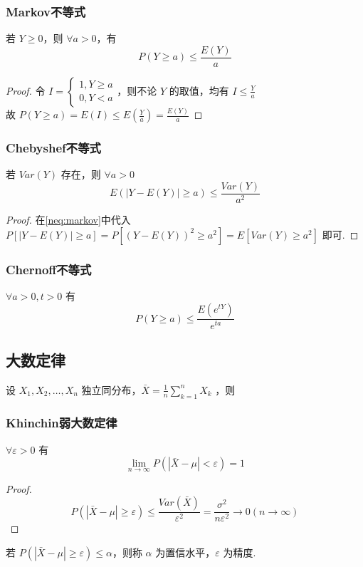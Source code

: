 \documentclass[./main.tex]{subfiles}
\begin{document}
\subsubsection{Markov不等式}
若 $Y\ge 0$，则 $\forall a>0$，有
\begin{equation}\label{neq:markov}
    P(Y\ge a)\le \frac{E(Y)}{a}
\end{equation}
\begin{proof}令 $I=\begin{cases}
    1, Y\ge a\\0,Y<a
\end{cases}$，则不论 $Y$ 的取值，均有 $I\le \frac{Y}{a}$\\故 $P(Y\ge a)=E(I)\le E(\frac{Y}{a})=\frac{E(Y)}{a}$
\end{proof}
\subsubsection{Chebyshef不等式}
若 $Var(Y)$ 存在，则 $\forall a>0$
\begin{equation}
    E(|Y-E(Y)|\ge a)\le \frac{Var(Y)}{a^2}
\end{equation}
\begin{proof}
    在\eqref{neq:markov}中代入 $P[|Y-E(Y)|\ge a]=P[(Y-E(Y))^2\ge a^2]=E[Var(Y)\ge a^2]$ 即可. 
\end{proof}
\subsubsection{Chernoff不等式}
$\forall a>0,t>0$ 有 
\begin{equation}
    P(Y\ge a)\le \frac{E(e^{tY})}{e^{ta}}
\end{equation}
\subsection{大数定律}
设 $X_1,X_2,\dots,X_n$ 独立同分布，$\bar{X}=\frac{1}{n}\sum_{k=1}^nX_k$ ，则\\
\subsubsection{Khinchin弱大数定律}$\forall \varepsilon>0$ 有
\begin{equation}
    \lim\limits_{n\rightarrow\infty}P(|\bar{X}-\mu|<\varepsilon)=1
\end{equation}
\begin{proof}
    $$P(|\bar{X}-\mu|\ge\varepsilon)\le\frac{Var(\bar{X})}{\varepsilon^2}=\frac{\sigma^2}{n\varepsilon^2}\rightarrow 0(n\rightarrow\infty)$$
\end{proof}
若 $P(|\bar{X}-\mu|\ge\varepsilon)\le\alpha$，则称 $\alpha$ 为置信水平，$\varepsilon$ 为精度. 
\end{document}
